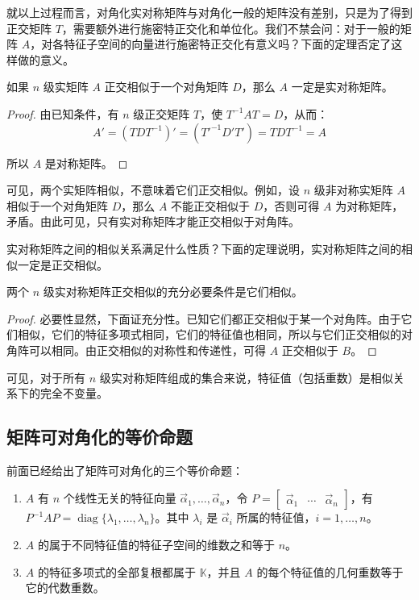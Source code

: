 就以上过程而言，对角化实对称矩阵与对角化一般的矩阵没有差别，只是为了得到正交矩阵 $T$，需要额外进行施密特正交化和单位化。我们不禁会问：对于一般的矩阵 $A$，对各特征子空间的向量进行施密特正交化有意义吗？下面的定理否定了这样做的意义。

\begin{theorem}
	如果 $n$ 级实矩阵 $A$ 正交相似于一个对角矩阵 $D$，那么 $A$ 一定是实对称矩阵。
\end{theorem}

\begin{proof}
	由已知条件，有 $n$ 级正交矩阵 $T$，使 $T^{-1} AT = D$，从而：
	$$
	A' = (TDT^{-1})' = ({T'}^{-1} D' T') = TDT^{-1} = A
	$$

	所以 $A$ 是对称矩阵。
\end{proof}

可见，两个实矩阵相似，不意味着它们正交相似。例如，设 $n$ 级非对称实矩阵 $A$ 相似于一个对角矩阵 $D$，那么 $A$ 不能正交相似于 $D$，否则可得 $A$ 为对称矩阵，矛盾。由此可见，只有实对称矩阵才能正交相似于对角阵。

实对称矩阵之间的相似关系满足什么性质？下面的定理说明，实对称矩阵之间的相似一定是正交相似。

\begin{theorem}
	两个 $n$ 级实对称矩阵正交相似的充分必要条件是它们相似。
\end{theorem}

\begin{proof}
	必要性显然，下面证充分性。已知它们都正交相似于某一个对角阵。由于它们相似，它们的特征多项式相同，它们的特征值也相同，所以与它们正交相似的对角阵可以相同。由正交相似的对称性和传递性，可得 $A$ 正交相似于 $B$。
\end{proof}

可见，对于所有 $n$ 级实对称矩阵组成的集合来说，特征值（包括重数）是相似关系下的完全不变量。

\subsection{矩阵可对角化的等价命题}

前面已经给出了矩阵可对角化的三个等价命题：
\begin{enumerate}
	\item $A$ 有 $n$ 个线性无关的特征向量 $\vec \alpha_1, \ldots, \vec \alpha_n$，令 $P = \begin{bmatrix} \vec \alpha_1 & \cdots & \vec \alpha_n \end{bmatrix}$，有 $P^{-1} A P = \operatorname{diag} \{\lambda_1, \ldots, \lambda_n\}$。其中 $\lambda_i$ 是 $\vec \alpha_i$ 所属的特征值，$i = 1, \ldots, n$。

	\item $A$ 的属于不同特征值的特征子空间的维数之和等于 $n$。

	\item $A$ 的特征多项式的全部复根都属于 $\mathbb K$，并且 $A$ 的每个特征值的几何重数等于它的代数重数。
\end{enumerate}

